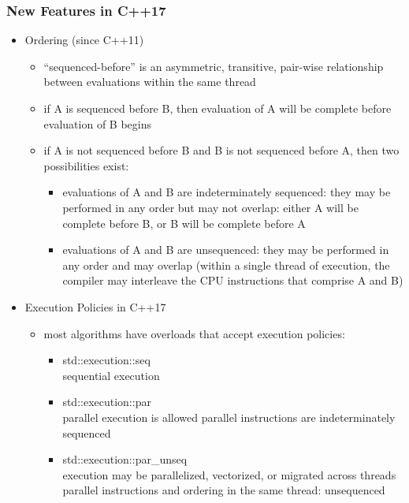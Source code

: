 \hypertarget{new-features-in-c17}{%
\subsubsection{New Features in C++17}\label{new-features-in-c17}}

\begin{itemize}
\tightlist
\item
  Ordering (since C++11)

  \begin{itemize}
  \tightlist
  \item
    ``sequenced-before'' is an asymmetric, transitive, pair-wise
    relationship between evaluations within the same thread
  \item
    if A is sequenced before B, then evaluation of A will be complete
    before evaluation of B begins
  \item
    if A is not sequenced before B and B is not sequenced before A, then
    two possibilities exist:

    \begin{itemize}
    \tightlist
    \item
      evaluations of A and B are indeterminately sequenced: they may be
      performed in any order but may not overlap: either A will be
      complete before B, or B will be complete before A
    \item
      evaluations of A and B are unsequenced: they may be performed in
      any order and may overlap (within a single thread of execution,
      the compiler may interleave the CPU instructions that comprise A
      and B)
    \end{itemize}
  \end{itemize}
\item
  Execution Policies in C++17

  \begin{itemize}
  \tightlist
  \item
    most algorithms have overloads that accept execution policies:

    \begin{itemize}
    \tightlist
    \item
      std::execution::seq\\
      sequential execution
    \item
      std::execution::par\\
      parallel execution is allowed parallel instructions are
      indeterminately sequenced
    \item
      std::execution::par\_unseq\\
      execution may be parallelized, vectorized, or migrated across
      threads\\
      parallel instructions and ordering in the same thread: unsequenced
    \end{itemize}
  \end{itemize}
\end{itemize}

